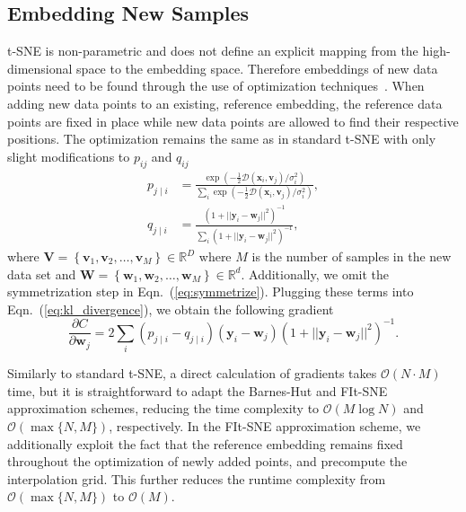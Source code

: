 \documentclass[twocolumn]{bmcart}
\newcommand{\opentsne}{\textsf{openTSNE}}
\begin{document}

\subsection*{Embedding New Samples}

t-SNE is non-parametric and does not define an explicit mapping from the
high-dimensional space to the embedding space. Therefore embeddings of new data
points need to be found through the use of optimization
techniques~\cite{policar2019embedding}. When adding new data points to an
existing, reference embedding, the reference data points are fixed in place
while new data points are allowed to find their respective positions. The
optimization remains the same as in standard t-SNE with only slight
modifications to $p_{ij}$ and $q_{ij}$
\begin{align}
p_{j \mid i} &= \frac{\exp \left ( -\frac{1}{2} \mathcal{D}(\mathbf{x}_i, \mathbf{v}_j) /  \sigma_i^2 \right )}{\sum_{i} \exp \left ( -\frac{1}{2} \mathcal{D}(\mathbf{x}_i, \mathbf{v}_j) / \sigma_i^2 \right )}, \\
q_{j \mid i} &= \frac{\left ( 1 + || \mathbf{y}_i - \mathbf{w}_j ||^2 \right )^{-1}}{\sum_{i}\left ( 1 + || \mathbf{y}_i - \mathbf{w}_j ||^2 \right )^{-1}},
\end{align}
\noindent where $\mathbf{V} = \left \{ \mathbf{v}_1, \mathbf{v}_2, \dots,
\mathbf{v}_M \right \} \in \mathbb{R}^D$ where $M$ is the number of samples in
the new data set and $\mathbf{W} = \left \{ \mathbf{w}_1, \mathbf{w}_2, \dots,
\mathbf{w}_M \right \} \in \mathbb{R}^d$. Additionally, we omit the
symmetrization step in Eqn.~(\ref{eq:symmetrize}). Plugging these terms into
Eqn.~(\ref{eq:kl_divergence}), we obtain the following gradient
\begin{equation}
\frac{\partial C}{\partial \mathbf{w}_j} = 2 \sum_i \left ( p_{j \mid i} - q_{j \mid i} \right ) \left ( \mathbf{y}_i - \mathbf{w}_j \right ) \left ( 1 + || \mathbf{y}_i - \mathbf{w}_j || ^2 \right )^{-1}.
\label{eq:gradient}
\end{equation}

Similarly to standard t-SNE, a direct calculation of gradients takes
$\mathcal{O}(N \cdot M)$ time, but it is straightforward to adapt the Barnes-Hut
and FIt-SNE approximation schemes, reducing the time complexity to
$\mathcal{O}(M \log N)$ and $\mathcal{O}(\max \{ N, M \})$, respectively. In the
FIt-SNE approximation scheme, we additionally exploit the fact that the
reference embedding remains fixed throughout the optimization of newly added
points, and precompute the interpolation grid. This further reduces the runtime
complexity from $\mathcal{O}(\max \{ N, M \})$ to $\mathcal{O}(M)$.
\end{document}
